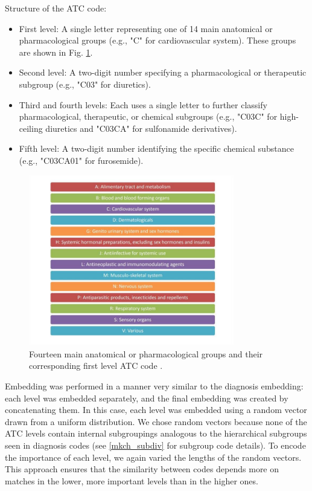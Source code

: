 Structure of the ATC code:

\begin{itemize}
	\item First level: A single letter representing one of 14 main anatomical or pharmacological groups (e.g., "C" for cardiovascular system). These groups are shown in Fig. \ref{fig:atc_l1}.
	\item Second level: A two-digit number specifying a pharmacological or therapeutic subgroup (e.g., "C03" for diuretics).
	\item Third and fourth levels: Each uses a single letter to further classify pharmacological, therapeutic, or chemical subgroups (e.g., "C03C" for high-ceiling diuretics and "C03CA" for sulfonamide derivatives).
	\item Fifth level: A two-digit number identifying the specific chemical substance (e.g., "C03CA01" for furosemide).
\end{itemize}

\begin{figure}[!h]
	\centering
	
	\includegraphics[width=0.8\textwidth]{images/atc_l1_classification_who.jpg}
	
	\caption{Fourteen main anatomical or pharmacological groups and their corresponding first level ATC code \cite{atc_who}.}
	\label{fig:atc_l1}
\end{figure}

Embedding was performed in a manner very similar to the diagnosis embedding: each level was embedded separately, and the final embedding was created by concatenating them. In this case, each level was embedded using a random vector drawn from a uniform distribution. We chose random vectors because none of the ATC levels contain internal subgroupings analogous to the hierarchical subgroups seen in diagnosis codes (see \ref{mkch_subdiv} for subgroup code details). To encode the importance of each level, we again varied the lengths of the random vectors. This approach ensures that the similarity between codes depends more on matches in the lower, more important levels than in the higher ones.
\\

